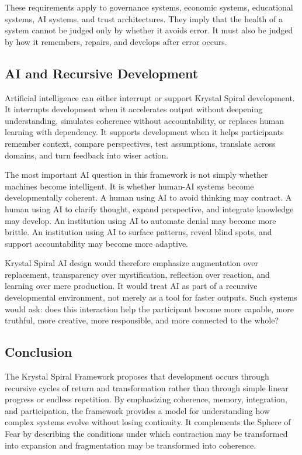 \documentclass[12pt]{article}
\begin{document}
These requirements apply to governance systems, economic systems, educational systems, AI systems, and trust architectures. They imply that the health of a system cannot be judged only by whether it avoids error. It must also be judged by how it remembers, repairs, and develops after error occurs.

\subsection{AI and Recursive Development}

Artificial intelligence can either interrupt or support Krystal Spiral development. It interrupts development when it accelerates output without deepening understanding, simulates coherence without accountability, or replaces human learning with dependency. It supports development when it helps participants remember context, compare perspectives, test assumptions, translate across domains, and turn feedback into wiser action.

The most important AI question in this framework is not simply whether machines become intelligent. It is whether human-AI systems become developmentally coherent. A human using AI to avoid thinking may contract. A human using AI to clarify thought, expand perspective, and integrate knowledge may develop. An institution using AI to automate denial may become more brittle. An institution using AI to surface patterns, reveal blind spots, and support accountability may become more adaptive.

Krystal Spiral AI design would therefore emphasize augmentation over replacement, transparency over mystification, reflection over reaction, and learning over mere production. It would treat AI as part of a recursive developmental environment, not merely as a tool for faster outputs. Such systems would ask: does this interaction help the participant become more capable, more truthful, more creative, more responsible, and more connected to the whole?

\subsection{Conclusion}

The Krystal Spiral Framework proposes that development occurs through recursive cycles of return and transformation rather than through simple linear progress or endless repetition. By emphasizing coherence, memory, integration, and participation, the framework provides a model for understanding how complex systems evolve without losing continuity. It complements the Sphere of Fear by describing the conditions under which contraction may be transformed into expansion and fragmentation may be transformed into coherence.
\end{document}
